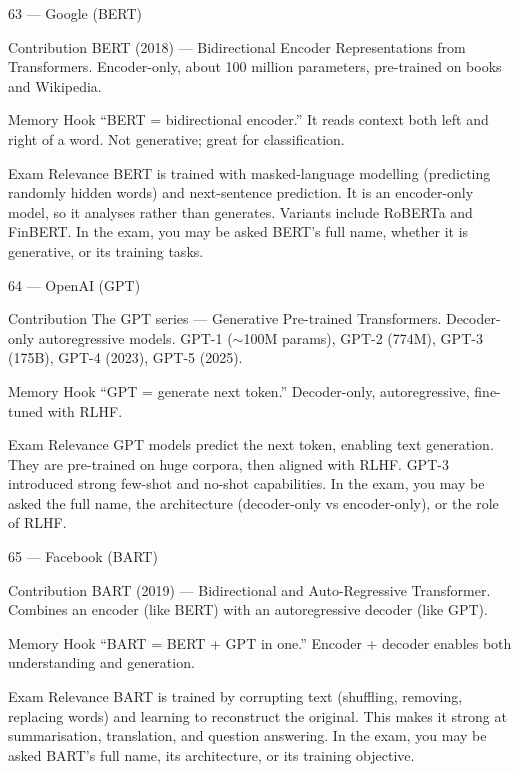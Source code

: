\documentclass[aspectratio=169,8pt]{beamer}
\begin{document}
	\begin{frame}{63 --- Google (BERT)}
		\begin{block}{Contribution}
			BERT (2018) --- Bidirectional Encoder Representations from Transformers. Encoder-only, about 100 million parameters, pre-trained on books and Wikipedia.
		\end{block}
		\begin{block}{Memory Hook}
			``BERT = bidirectional encoder.'' It reads context both left and right of a word. Not generative; great for classification.
		\end{block}
		\begin{block}{Exam Relevance}
			BERT is trained with masked-language modelling (predicting randomly hidden words) and next-sentence prediction. It is an encoder-only model, so it analyses rather than generates. Variants include RoBERTa and FinBERT. In the exam, you may be asked BERT's full name, whether it is generative, or its training tasks.
		\end{block}
	\end{frame}
	
	\begin{frame}{64 --- OpenAI (GPT)}
		\begin{block}{Contribution}
			The GPT series --- Generative Pre-trained Transformers. Decoder-only autoregressive models. GPT-1 ($\sim$100M params), GPT-2 (774M), GPT-3 (175B), GPT-4 (2023), GPT-5 (2025).
		\end{block}
		\begin{block}{Memory Hook}
			``GPT = generate next token.'' Decoder-only, autoregressive, fine-tuned with RLHF.
		\end{block}
		\begin{block}{Exam Relevance}
			GPT models predict the next token, enabling text generation. They are pre-trained on huge corpora, then aligned with RLHF. GPT-3 introduced strong few-shot and no-shot capabilities. In the exam, you may be asked the full name, the architecture (decoder-only vs encoder-only), or the role of RLHF.
		\end{block}
	\end{frame}
	
	\begin{frame}{65 --- Facebook (BART)}
		\begin{block}{Contribution}
			BART (2019) --- Bidirectional and Auto-Regressive Transformer. Combines an encoder (like BERT) with an autoregressive decoder (like GPT).
		\end{block}
		\begin{block}{Memory Hook}
			``BART = BERT + GPT in one.'' Encoder + decoder enables both understanding and generation.
		\end{block}
		\begin{block}{Exam Relevance}
			BART is trained by corrupting text (shuffling, removing, replacing words) and learning to reconstruct the original. This makes it strong at summarisation, translation, and question answering. In the exam, you may be asked BART's full name, its architecture, or its training objective.
		\end{block}
	\end{frame}
	
\end{document}
